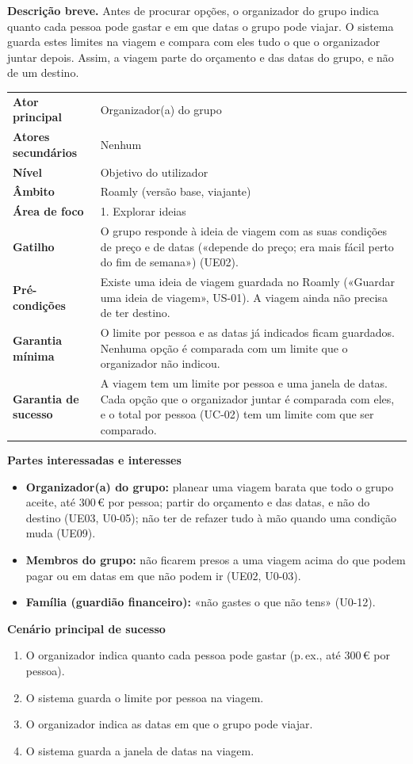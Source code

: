 \documentclass[11pt,a4paper]{article}
\newcommand{\reg}[1]{{\footnotesize\textcolor{pendente}{(#1)}}}
\newenvironment{usecase}[2]{%
  \par\medskip\noindent{\large\bfseries\color{roamly}#1: #2}\par\smallskip\small\noindent\ignorespaces}{\par\medskip}
\newcommand{\ucField}[2]{\textbf{#1} & #2 \\}
\begin{document}
\begin{usecase}{UC-01}{Definir os limites da viagem}
\textbf{Descrição breve.} Antes de procurar opções, o organizador do grupo indica quanto cada pessoa pode gastar e em que datas o grupo pode viajar. O sistema guarda estes limites na viagem e compara com eles tudo o que o organizador juntar depois. Assim, a viagem parte do orçamento e das datas do grupo, e não de um destino.\par\smallskip
\begin{tabularx}{\textwidth}{@{}>{\raggedright\arraybackslash}p{3.4cm}L@{}}
\toprule
\ucField{Ator principal}{Organizador(a) do grupo}
\ucField{Atores secundários}{Nenhum}
\ucField{Nível}{Objetivo do utilizador}
\ucField{Âmbito}{Roamly (versão base, viajante)}
\ucField{Área de foco}{1. Explorar ideias}
\ucField{Gatilho}{O grupo responde à ideia de viagem com as suas condições de preço e de datas («depende do preço; era mais fácil perto do fim de semana») \reg{UE02}.}
\ucField{Pré-condições}{Existe uma ideia de viagem guardada no Roamly («Guardar uma ideia de viagem», US-01). A viagem ainda não precisa de ter destino.}
\ucField{Garantia mínima}{O limite por pessoa e as datas já indicados ficam guardados. Nenhuma opção é comparada com um limite que o organizador não indicou.}
\ucField{Garantia de sucesso}{A viagem tem um limite por pessoa e uma janela de datas. Cada opção que o organizador juntar é comparada com eles, e o total por pessoa (UC-02) tem um limite com que ser comparado.}
\bottomrule
\end{tabularx}

\medskip
\textbf{Partes interessadas e interesses}
\begin{itemize}
  \item \textbf{Organizador(a) do grupo:} planear uma viagem barata que todo o grupo aceite, até 300\,€ por pessoa; partir do orçamento e das datas, e não do destino \reg{UE03, U0-05}; não ter de refazer tudo à mão quando uma condição muda \reg{UE09}.
  \item \textbf{Membros do grupo:} não ficarem presos a uma viagem acima do que podem pagar ou em datas em que não podem ir \reg{UE02, U0-03}.
  \item \textbf{Família (guardião financeiro):} «não gastes o que não tens» \reg{U0-12}.
\end{itemize}

\textbf{Cenário principal de sucesso}
\begin{enumerate}
  \item O organizador indica quanto cada pessoa pode gastar (p.\,ex., até 300\,€ por pessoa).
  \item O sistema guarda o limite por pessoa na viagem.
  \item O organizador indica as datas em que o grupo pode viajar.
  \item O sistema guarda a janela de datas na viagem.
\end{enumerate}


\end{usecase}
\end{document}
